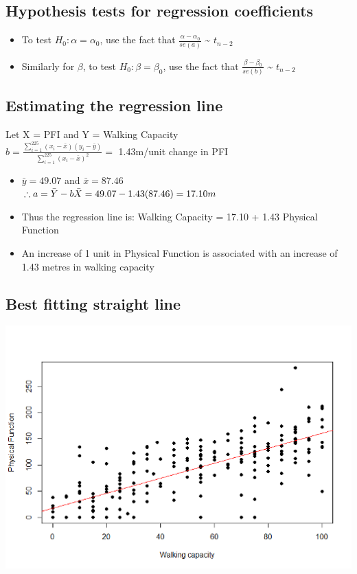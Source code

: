 \documentclass[
]{book}
\providecommand{\tightlist}{%
  \setlength{\itemsep}{0pt}\setlength{\parskip}{0pt}}
\begin{document}
\hypertarget{hypothesis-tests-for-regression-coefficients}{%
\subsection{Hypothesis tests for regression coefficients}\label{hypothesis-tests-for-regression-coefficients}}

\begin{itemize}
\tightlist
\item
  To test \(H_0:\alpha=\alpha_0\), use the fact that \(\frac{\alpha-\alpha_0}{se(a)}\) \textasciitilde{} \(t_{n-2}\)
\item
  Similarly for \(\beta\), to test \(H_0:\beta=\beta_0\), use the fact that \(\frac{\beta-\beta_0}{se(b)}\) \textasciitilde{} \(t_{n-2}\)
\end{itemize}

\hypertarget{estimating-the-regression-line}{%
\subsection{Estimating the regression line}\label{estimating-the-regression-line}}

Let X = PFI and Y = Walking Capacity\\
\(b=\frac{\sum_{i=1}^{225}(x_i-\bar x)(y_i-\bar y)}{\sum_{i=1}^{225}(x_i-\bar x)^2}=\) 1.43m/unit change in PFI

\begin{itemize}
\tightlist
\item
  \(\bar y = 49.07\) and \(\bar x = 87.46\)\\
  \(\therefore a=\bar Y-b\bar X=49.07-1.43(87.46)=17.10\space m\)
\item
  Thus the regression line is: Walking Capacity = 17.10 + 1.43 Physical Function
\item
  An increase of 1 unit in Physical Function is associated with an increase of 1.43 metres in walking capacity
\end{itemize}

\hypertarget{best-fitting-straight-line}{%
\subsection{Best fitting straight line}\label{best-fitting-straight-line}}

\includegraphics[width=1\linewidth]{./12_33}
\end{document}
